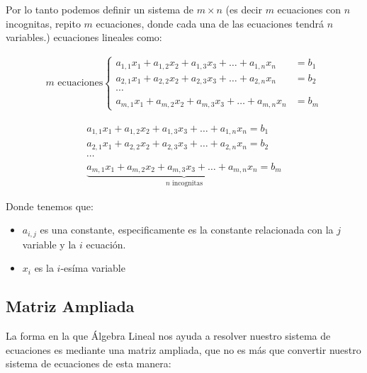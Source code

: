 \documentclass[12pt, fleqn]{report}                             %
\theoremstyle{break}                                            %
\begin{document}
                Por lo tanto podemos definir un sistema de $m \times n$ (es decir $m$ ecuaciones
                con $n$ incognitas, repito $m$ ecuaciones, donde cada una de las ecuaciones tendrá
                $n$ variables.) ecuaciones lineales como:

                \begin{align*}
                    m \text{ ecuaciones}
                    \begin{cases}
                        a_{1,1}x_1 + a_{1,2}x_2 + a_{1,3}x_3 + \dots + a_{1,n}x_n &= b_1  \\
                        a_{2,1}x_1 + a_{2,2}x_2 + a_{2,3}x_3 + \dots + a_{2,n}x_n &= b_2  \\
                        \cdots                                                            \\
                        a_{m,1}x_1 + a_{m,2}x_2 + a_{m,3}x_3 + \dots + a_{m,n}x_n &= b_m  
                    \end{cases}      
                \end{align*}

                \begin{align*}
                    a_{1,1}x_1 + a_{1,2}x_2 + a_{1,3}x_3 + \dots + a_{1,n}x_n = b_1    \\
                    a_{2,1}x_1 + a_{2,2}x_2 + a_{2,3}x_3 + \dots + a_{2,n}x_n = b_2    \\
                    \cdots                                                             \\
                    \underbrace{a_{m,1}x_1 + a_{m,2}x_2 + a_{m,3}x_3 + \dots + a_{m,n}x_n = b_m}_\text{$n$ incognitas}
                \end{align*}

                Donde tenemos que:
                \begin{itemize}
                    \item $a_{i, j}$ es una constante, especificamente es la constante
                        relacionada con la $j$ variable y la $i$ ecuación.

                    \item $x_{i}$ es la $i$-esíma variable
                \end{itemize}


            \clearpage
            \subsection{Matriz Ampliada}
                La forma en la que Álgebra Lineal nos ayuda a resolver nuestro sistema de ecuaciones
                es mediante una matriz ampliada, que no es más que convertir nuestro sistema
                de ecuaciones de esta manera:
\end{document}
